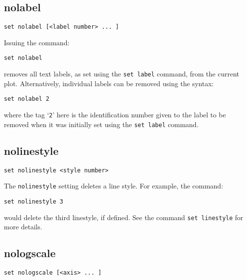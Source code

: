 \documentclass[a4paper,onecolumn,11pt]{book}
\begin{document}
\subsection{nolabel}

\begin{verbatim}
set nolabel [<label number> ... ]
\end{verbatim}

Issuing the command:

\begin{verbatim}
set nolabel
\end{verbatim}

removes all text labels, as set using the {\tt set label} command, from the
current plot. Alternatively, individual labels can be removed using the syntax:

\begin{verbatim}
set nolabel 2
\end{verbatim}

where the tag `{\tt 2}' here is the identification number given to the label to be 
removed when it was initially set using the {\tt set label} command.


\subsection{nolinestyle}

\begin{verbatim}
set nolinestyle <style number>
\end{verbatim}

The {\tt nolinestyle} setting deletes a line style. For example, the command:

\begin{verbatim}
set nolinestyle 3
\end{verbatim}

\noindent would delete the third linestyle, if defined. See the command {\tt set
linestyle} for more details.


\subsection{nologscale}

\begin{verbatim}
set nologscale [<axis> ... ]
\end{verbatim}
\end{document}
